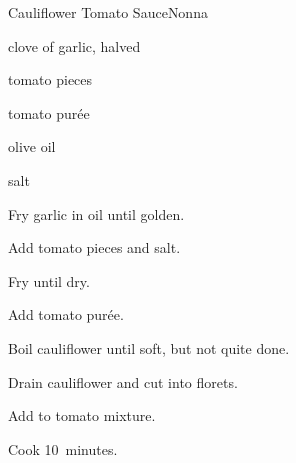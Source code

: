 \begin{recipe}{Cauliflower Tomato Sauce}{Nonna}{}

\begin{ingredients}
\item clove of garlic, halved
\item {}
\item tomato pieces
\item tomato pur\'ee
\item olive oil
\item salt
\end{ingredients}

\begin{directions}
\item Fry garlic in oil until golden.
\item Add tomato pieces and salt.
\item Fry until dry.
\item Add tomato pur\'ee.
\item Boil cauliflower until soft, but not quite done.
\item Drain cauliflower and cut into florets.
\item Add to tomato mixture.
\item Cook 10~minutes.
\end{directions}

\end{recipe}
